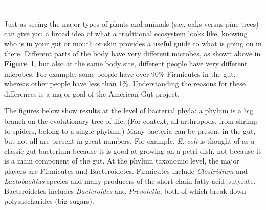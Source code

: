 \documentclass[10pt,letterpaper]{article}
\begin{document}
\colorbox{agpRust}{\parbox{\textwidth}{\vspace{1mm} \LARGE \centering \textcolor{white}{What kinds of microbes are in different sample types?} \vspace{1mm}}}

Just as seeing the major types of plants and animals (say, oaks versus pine trees) can give you a broad idea of what a traditional ecosystem looks like, knowing who is in your gut or mouth or skin provides a useful guide to what is going on in there.  Different parts of the body have very different microbes, as shown above in {\bf Figure 1}, but also at the same body site, different people have very different microbes. For example, some people have over 90\% Firmicutes in the gut, whereas other people have less than 1\%. Understanding the reasons for these differences is a major goal of the American Gut project.

The figures below show results at the level of bacterial phyla: a phylum is a big branch on the evolutionary tree of life. (For context, all arthropods, from shrimp to spiders, belong to a single phylum.) Many bacteria can be present in the gut, but not all are present in great numbers. For example, {\em E. coli} is  thought of as a classic gut bacterium because it is good at growing on a petri dish, not because it is a main component of the gut. At the phylum taxonomic level, the major players are Firmicutes and Bacteroidetes. Firmicutes include \emph{Clostridium} and \emph{Lactobacillus} species and many producers of the short-chain fatty acid butyrate. Bacteroidetes includes \emph{Bacteroides} and \emph{Prevotella}, both of which break down polysaccharides (big sugars).
\end{document}
